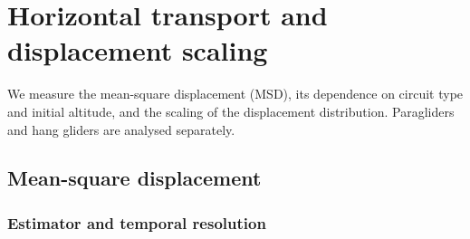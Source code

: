 \chapter{Horizontal transport and displacement scaling}
\label{ch:fixed-transport}





We measure the mean-square displacement (MSD), its dependence on circuit type and
initial altitude, and the scaling of the displacement distribution. Paragliders and
hang gliders are analysed separately.

\section{Mean-square displacement}
\label{sec:fixed-msd}
\subsection{Estimator and temporal resolution}

